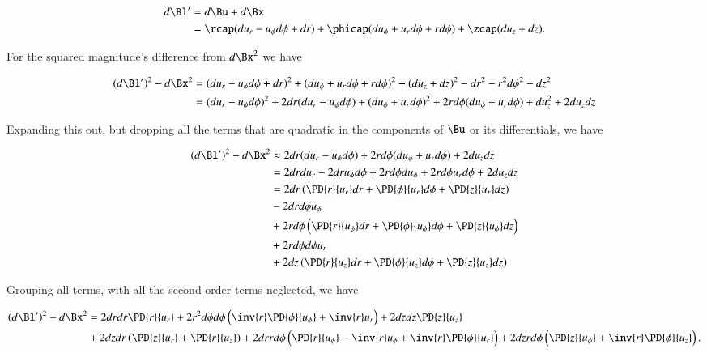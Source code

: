 \begin{align*}
d\Bl' 
&= d\Bu + d\Bx 
\\
&= \rcap( du_r - u_\phi d\phi + dr )
+ \phicap ( du_\phi + u_r d\phi + r d\phi )
+ \zcap ( du_z + dz ).
\end{align*}

For the squared magnitude's difference from $d\Bx^2$ we have

\begin{align*}
(d\Bl')^2 - d\Bx^2
&= 
( du_r - u_\phi d\phi + dr )^2
+ ( du_\phi + u_r d\phi + r d\phi )^2
+ ( du_z + dz )^2
-dr^2 - r^2 d\phi^2 - dz^2 \\
&=
( du_r - u_\phi d\phi )^2 
+ 2 dr ( du_r - u_\phi d\phi )
+ ( du_\phi + u_r d\phi )^2
+ 2 r d\phi ( du_\phi + u_r d\phi )
+ du_z^2 + 2 du_z dz \\
\end{align*}

Expanding this out, but dropping all the terms that are quadratic in the components of $\Bu$ or its differentials, we have

\begin{align*}
(d\Bl')^2 - d\Bx^2
&\approx
  2 dr ( du_r - u_\phi d\phi )
+ 2 r d\phi ( du_\phi + u_r d\phi )
+ 2 du_z dz \\
&=
  2 dr du_r 
- 2 dr u_\phi d\phi 
+ 2 r d\phi du_\phi 
+ 2 r d\phi u_r d\phi 
+ 2 du_z dz 
\\
&=
  2 dr 
\left( 
\PD{r}{u_r} dr
+\PD{\phi}{u_r} d\phi
+\PD{z}{u_r} dz
\right) \\
&- 2 dr d\phi u_\phi  \\
&+ 2 r d\phi 
\left( 
\PD{r}{u_\phi} dr
+\PD{\phi}{u_\phi} d\phi
+\PD{z}{u_\phi} dz
\right) \\
&+ 2 r d\phi d\phi u_r \\
&+ 2 
dz 
\left( 
\PD{r}{u_z} dr
+\PD{\phi}{u_z} d\phi
+\PD{z}{u_z} dz
\right) \\
\end{align*}

Grouping all terms, with all the second order terms neglected, we have

\begin{equation}\label{eqn:continuumL2:450}
\begin{aligned}
(d\Bl')^2 - d\Bx^2
&=
2 dr dr \PD{r}{u_r} 
+ 2 r^2 d\phi d\phi \left( \inv{r} \PD{\phi}{u_\phi} +\inv{r} u_r \right)
+ 2 dz dz \PD{z}{u_z}  \\
&+ 2 dz dr \left( \PD{z}{u_r} + \PD{r}{u_z} \right)
+ 2 dr r d\phi \left( \PD{r}{u_\phi} - \inv{r} u_\phi + \inv{r} \PD{\phi}{u_r} \right)
+ 2 dz r d\phi \left( \PD{z}{u_\phi} +\inv{r} \PD{\phi}{u_z} \right).
\end{aligned}
\end{equation}

